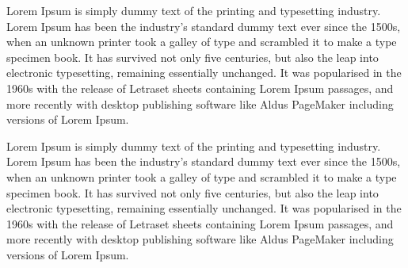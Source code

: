 Lorem Ipsum is simply dummy text of the printing and typesetting industry. Lorem Ipsum has been the industry's standard dummy text ever since the 1500s, when an unknown printer took a galley of type and scrambled it to make a type specimen book. It has survived not only five centuries, but also the leap into electronic typesetting, remaining essentially unchanged. It was popularised in the 1960s with the release of Letraset sheets containing Lorem Ipsum passages, and more recently with desktop publishing software like Aldus PageMaker including versions of Lorem Ipsum.

Lorem Ipsum is simply dummy text of the printing and typesetting industry. Lorem Ipsum has been the industry's standard dummy text ever since the 1500s, when an unknown printer took a galley of type and scrambled it to make a type specimen book. It has survived not only five centuries, but also the leap into electronic typesetting, remaining essentially unchanged. It was popularised in the 1960s with the release of Letraset sheets containing Lorem Ipsum passages, and more recently with desktop publishing software like Aldus PageMaker including versions of Lorem Ipsum.


